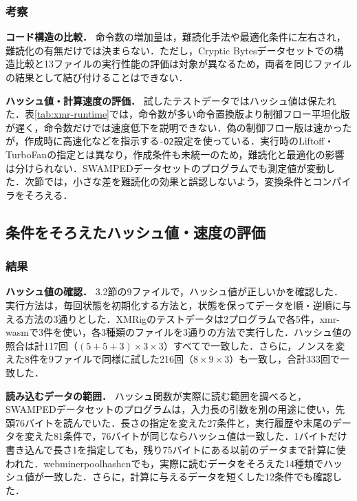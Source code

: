 \documentclass[submit,techrep]{ipsj}
\begin{document}
\subsubsection{考察}
\noindent\textbf{コード構造の比較．}
命令数の増加量は，難読化手法や最適化条件に左右され，難読化の有無だけでは決まらない．ただし，Cryptic Bytesデータセットでの構造比較と13ファイルの実行性能の評価は対象が異なるため，両者を同じファイルの結果として結び付けることはできない．

\noindent\textbf{ハッシュ値・計算速度の評価．}
試したテストデータではハッシュ値は保たれた．表\ref{tab:xmr-runtime}では，命令数が多い命令置換版より制御フロー平坦化版が遅く，命令数だけでは速度低下を説明できない．偽の制御フロー版は速かったが，作成時に高速化などを指示する\texttt{-O2}設定\cite{emscriptenOptimization}を使っている．実行時のLiftoff・TurboFanの指定とは異なり，作成条件も未統一のため，難読化と最適化の影響は分けられない．SWAMPEDデータセットのプログラムでも測定値が変動した．次節では，小さな差を難読化の効果と誤認しないよう，変換条件とコンパイラをそろえる．

\subsection{条件をそろえたハッシュ値・速度の評価}
\subsubsection{結果}
\noindent\textbf{ハッシュ値の確認．}
3.2節の9ファイルで，ハッシュ値が正しいかを確認した．実行方法は，毎回状態を初期化する方法と，状態を保ってデータを順・逆順に与える方法の3通りとした．XMRigのテストデータは2プログラムで各5件，xmr-wasmで3件を使い，各3種類のファイルを3通りの方法で実行した．ハッシュ値の照合は計117回（$(5+5+3)\times3\times3$）すべてで一致した．さらに，ノンスを変えた8件を9ファイルで同様に試した216回（$8\times9\times3$）も一致し，合計333回で一致した．

\label{sec:input-results}
\noindent\textbf{読み込むデータの範囲．}
ハッシュ関数が実際に読む範囲を調べると，SWAMPEDデータセットのプログラムは，入力長の引数を別の用途に使い，先頭76バイトを読んでいた．長さの指定を変えた27条件と，実行履歴や末尾のデータを変えた81条件で，76バイトが同じならハッシュ値は一致した．1バイトだけ書き込んで長さ1を指定しても，残り75バイトにある以前のデータまで計算に使われた．webminerpoolhashcnでも，実際に読むデータをそろえた14種類でハッシュ値が一致した．さらに，計算に与えるデータを短くした12条件でも確認した．
\end{document}
